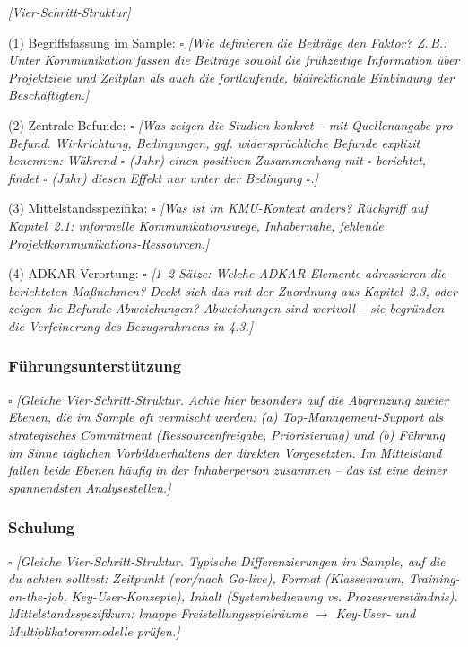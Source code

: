 \textit{[Vier-Schritt-Struktur]}

(1) Begriffsfassung im Sample: $\square$ \textit{[Wie definieren die Beitr\"age den Faktor? Z.\,B.: Unter Kommunikation fassen die Beitr\"age sowohl die fr\"uhzeitige Information \"uber Projektziele und Zeitplan als auch die fortlaufende, bidirektionale Einbindung der Besch\"aftigten.]}

(2) Zentrale Befunde: $\square$ \textit{[Was zeigen die Studien konkret -- mit Quellenangabe pro Befund. Wirkrichtung, Bedingungen, ggf. widerspr\"uchliche Befunde explizit benennen: W\"ahrend $\square$ (Jahr) einen positiven Zusammenhang mit $\square$ berichtet, findet $\square$ (Jahr) diesen Effekt nur unter der Bedingung $\square$.]}

(3) Mittelstandsspezifika: $\square$ \textit{[Was ist im KMU-Kontext anders? R\"uckgriff auf Kapitel~2.1: informelle Kommunikationswege, Inhabern\"ahe, fehlende Projektkommunikations-Ressourcen.]}

(4) ADKAR-Verortung: $\square$ \textit{[1--2 S\"atze: Welche ADKAR-Elemente adressieren die berichteten Ma\ss{}nahmen? Deckt sich das mit der Zuordnung aus Kapitel~2.3, oder zeigen die Befunde Abweichungen? Abweichungen sind wertvoll -- sie begr\"unden die Verfeinerung des Bezugsrahmens in 4.3.]}

\subsubsection{F\"uhrungsunterst\"utzung}

$\square$ \textit{[Gleiche Vier-Schritt-Struktur. Achte hier besonders auf die Abgrenzung zweier Ebenen, die im Sample oft vermischt werden: (a) Top-Management-Support als strategisches Commitment (Ressourcenfreigabe, Priorisierung) und (b) F\"uhrung im Sinne t\"aglichen Vorbildverhaltens der direkten Vorgesetzten. Im Mittelstand fallen beide Ebenen h\"aufig in der Inhaberperson zusammen -- das ist eine deiner spannendsten Analysestellen.]}

\subsubsection{Schulung}

$\square$ \textit{[Gleiche Vier-Schritt-Struktur. Typische Differenzierungen im Sample, auf die du achten solltest: Zeitpunkt (vor/nach Go-live), Format (Klassenraum, Training-on-the-job, Key-User-Konzepte), Inhalt (Systembedienung vs. Prozessverst\"andnis). Mittelstandsspezifikum: knappe Freistellungsspielr\"aume $\rightarrow$ Key-User- und Multiplikatorenmodelle pr\"ufen.]}

